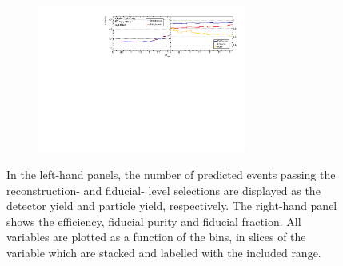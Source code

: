 \begin{figure}[htb]
\begin{subfigure}{.99\textwidth}
    \end{subfigure}
    \begin{subfigure}{.99\textwidth}\centering
        \includegraphics[width = 0.75\textwidth]{Figures/m4l/UnfoldingStudies/v014_inputs/deltaPhiPairs_m4loffshellinputs.pdf}
    \end{subfigure}
    \caption{In the left-hand panels, the number of predicted events passing the reconstruction- and fiducial- level selections are displayed as the detector yield and particle yield, respectively. The right-hand panel shows the efficiency, fiducial purity and fiducial fraction. All variables are plotted as a function of the \dPhiPairs bins, in slices of the \mFourL variable which are stacked and labelled with the included \mFourL range.
    \label{fig:dphipunf}}
\end{figure}  

\FloatBarrier
\clearpage

